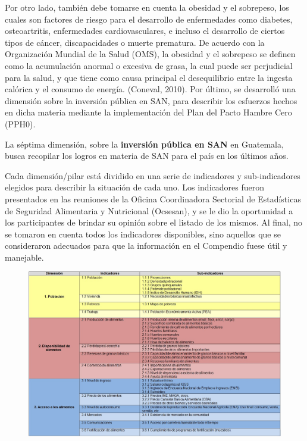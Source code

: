 Por otro lado, también debe tomarse en cuenta la obesidad y el sobrepeso, los cuales son factores de riesgo para el desarrollo de enfermedades como diabetes, osteoartritis, enfermedades cardiovasculares, e incluso el desarrollo de ciertos tipos de cáncer, discapacidades o muerte prematura. De acuerdo con la Organización Mundial de la Salud (OMS), la obesidad y el sobrepeso se definen como la acumulación anormal o excesiva de grasa, la cual puede ser perjudicial para la salud, y que tiene como causa principal el desequilibrio entre la ingesta calórica y el consumo de energía.  (Coneval, 2010). Por último, se desarrolló una dimensión sobre la inversión pública en SAN, para describir los esfuerzos hechos en dicha materia mediante la implementación del Plan del Pacto Hambre Cero (PPH0).

La séptima dimensión, sobre la \textbf{inversión pública en SAN} en Guatemala, busca recopilar los logros en materia de SAN para el país en los últimos años.

Cada dimensión/pilar está dividido en una serie de indicadores y sub-indicadores elegidos para describir la situación de cada uno. Los indicadores fueron presentados en las reuniones de la Oficina Coordinadora Sectorial de Estadísticas de Seguridad Alimentaria y Nutricional (Ocsesan), y se le dio la oportunidad a los participantes de brindar su opinión sobre el listado de los mismos. Al final, no se tomaron en cuenta todos los indicadores disponibles, sino aquellos que se consideraron adecuados para que la información en el Compendio fuese útil y manejable.





\begin{landscape}
	
	\begin{figure}
		\centering
		\includegraphics[width=1.4\textwidth]{cuadro1}
		\label{cuadro1}
	\end{figure}
\end{landscape}

